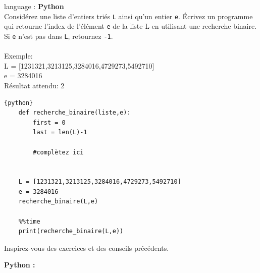 \begin{Exercice}[10 minutes] language : \textbf{Python}\\

Considérez une liste d’entiers triés \lstinline{L} ainsi qu’un entier \lstinline{e}. Écrivez un programme qui retourne l'index de l'élément \lstinline{e} de la liste L en utilisant une recherche binaire. Si \lstinline{e} n’est pas dans \lstinline{L}, retournez \lstinline{-1}.\\\\

Exemple:\\

    L = [1231321,3213125,3284016,4729273,5492710] \\

    e = 3284016\\

Résultat attendu: 2\\

    \begin{lstlisting}{python}
    def recherche_binaire(liste,e):
        first = 0 
        last = len(L)-1
        
        #complètez ici
    
    
    L = [1231321,3213125,3284016,4729273,5492710]
    e = 3284016
    recherche_binaire(L,e)
    
    %%time
    print(recherche_binaire(L,e))
    \end{lstlisting}

\begin{conseil}
    Inspirez-vous des exercices et des conseils précédents. 
\end{conseil}

    \begin{solution}
        \textbf{Python :}
        
    \end{solution}

\end{Exercice}


